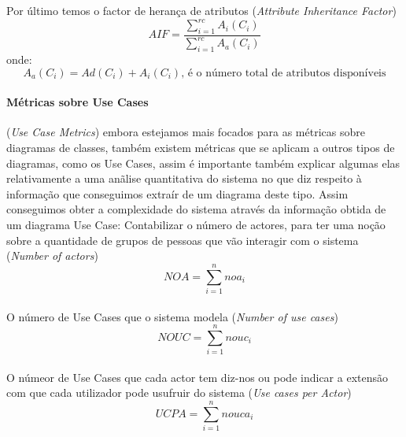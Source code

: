 Por último temos o factor de herança de atributos (\textit{Attribute Inheritance Factor}) $$AIF = \frac{\sum_{i=1}^{rc} A_i(C_i)}{\sum_{i=1}^{rc} A_a(C_i)} $$
onde:
$$ A_a(C_i) = Ad(C_i) + A_i(C_i)\textrm{, é o número total de atributos disponíveis}$$
\paragraph{Métricas sobre Use Cases} (\textit{Use Case Metrics}) embora estejamos mais focados para as métricas sobre diagramas de classes,
também existem métricas que se aplicam a outros tipos de diagramas, como os Use Cases, assim é importante também explicar algumas elas
relativamente a uma anãlise quantitativa do sistema no que diz respeito à informação que conseguimos extraír de um diagrama deste tipo.
Assim conseguimos obter a complexidade do sistema através da informação obtida de um diagrama Use Case:
Contabilizar o número de actores, para ter uma noção sobre a quantidade de grupos de pessoas que
vão interagir com o sistema (\textit{Number of actors})  $$NOA = \sum_{i=1}^{n} noa_i $$
\\
O número de Use Cases que o sistema modela (\textit{Number of use cases})  $$NOUC = \sum_{i=1}^{n} nouc_i $$
\\
O númeor de Use Cases que cada actor tem diz-nos ou pode indicar a extensão com que cada utilizador pode
usufruir do sistema (\textit{Use cases per Actor}) $$UCPA = \sum_{i=1}^{n} nouca_i $$
